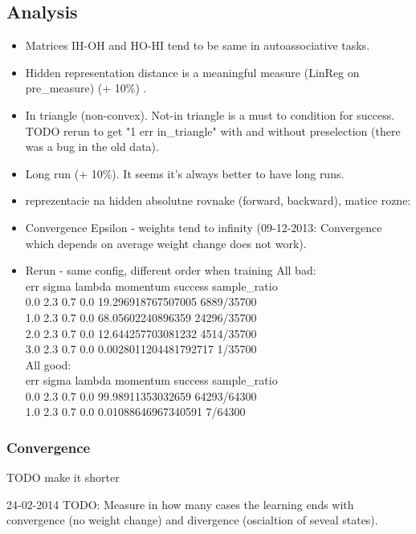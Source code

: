 \subsection{Analysis} 
\begin{itemize} 
\item Matrices IH-OH and HO-HI tend to be same in autoassociative tasks. 
\item Hidden representation distance is a meaningful measure (LinReg on pre\_measure) (+ 10\%) . 
\item In triangle (non-convex). Not-in triangle is a must to condition for success. \\
TODO rerun to get "1 err in\_triangle" with and without preselection (there was a bug in the old data). 

\item Long run (+ 10\%). It seems it's always better to have long runs.  
\item reprezentacie na hidden absolutne rovnake (forward, backward), matice rozne:
\item Convergence Epsilon - weights tend to infinity (09-12-2013: Convergence which depends on average weight change does not work). 
\item Rerun - same config, different order when training 
All bad: \\
err sigma lambda momentum success sample\_ratio \\
0.0 2.3 0.7 0.0 19.296918767507005 6889/35700 \\
1.0 2.3 0.7 0.0 68.05602240896359 24296/35700 \\
2.0 2.3 0.7 0.0 12.644257703081232 4514/35700 \\
3.0 2.3 0.7 0.0 0.0028011204481792717 1/35700 \\

All good:  \\
err sigma lambda momentum success sample\_ratio \\
0.0 2.3 0.7 0.0 99.98911353032659 64293/64300 \\
1.0 2.3 0.7 0.0 0.01088646967340591 7/64300 \\

\end{itemize}

\subsubsection{Convergence} 
TODO make it shorter 

24-02-2014
TODO: Measure in how many cases the learning ends with convergence (no weight change) and divergence (oscialtion of seveal states). 

